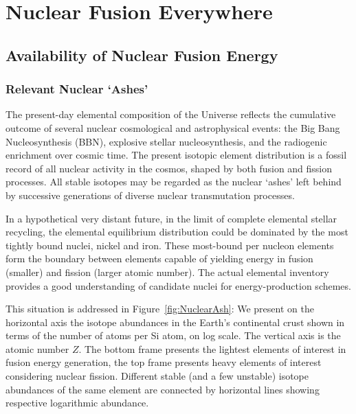 \documentclass[particles,article,accept,pdftex,moreauthors]{Definitions/mdpi}
\newcommand{\rf}[1]{Figure~\ref{#1}}
\begin{document}
\section{Nuclear Fusion Everywhere}\label{sec:Fusion}
\subsection{Availability of Nuclear Fusion Energy}\label{ssec:Nenergy}
\subsubsection{Relevant Nuclear `Ashes'}\label{sssec:NuclearAshes}
The present-day elemental composition of the Universe reflects the cumulative outcome of several nuclear cosmological and astrophysical events: the Big Bang Nucleosynthesis (BBN), explosive stellar nucleosynthesis, and the radiogenic enrichment over cosmic time. The present isotopic element distribution is a fossil record of all nuclear activity in the cosmos, shaped by both fusion and fission processes. All stable isotopes may be regarded as the nuclear `ashes' left behind by successive generations of diverse nuclear transmutation processes.

In a hypothetical very distant future, in the limit of complete elemental stellar recycling, the elemental equilibrium distribution could be dominated by the most tightly bound nuclei, nickel and iron. These most-bound per nucleon elements form the boundary between elements capable of yielding energy in fusion (smaller) and fission (larger atomic number). The actual elemental inventory provides a good understanding of candidate nuclei for energy-production schemes.

This situation is addressed in \rf{fig:NuclearAsh}: We present on the horizontal axis the isotope abundances in the Earth's continental crust shown in terms of the number of atoms per Si atom, on log scale. The vertical axis is the atomic number $Z$. The bottom frame presents the lightest elements of interest in fusion energy generation, the top frame presents heavy elements of interest considering nuclear fission. Different stable (and a few unstable) isotope abundances of the same element are connected by horizontal lines showing respective logarithmic abundance.
\end{document}
